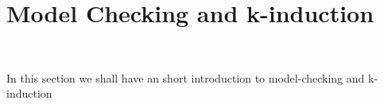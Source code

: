 \section{Model Checking and k-induction}~\label{sec:mck}

In this section we shall have an short introduction to model-checking and k-induction




